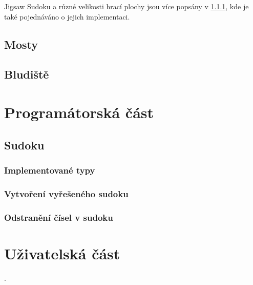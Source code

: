 \documentclass[
  master,
  program=ainfvs,
  biblatex,
  figures=true,
  tables=false,
  sourcecodes,
  glossaries,
  index
]{kidiplom}
\begin{document}
Jigsaw Sudoku a různé velikosti hrací plochy jsou více popsány v \ref{implementedSudokuTypes}, kde je také pojednáváno o jejich implementaci.

\subsection{Mosty}

\subsection{Bludiště}

\section{Programátorská část}

\subsection{Sudoku}

\subsubsection{Implementované typy}
\label{implementedSudokuTypes}

\subsubsection{Vytvoření vyřešeného sudoku}

\subsubsection{Odstranění čísel v sudoku}

\section{Uživatelská část}

\begin{kiconclusions}

\end{kiconclusions}

\begin{kiconclusions}[english]
	
\end{kiconclusions}

\printglossary

\printbibliography

.
\printindex
\end{document}
